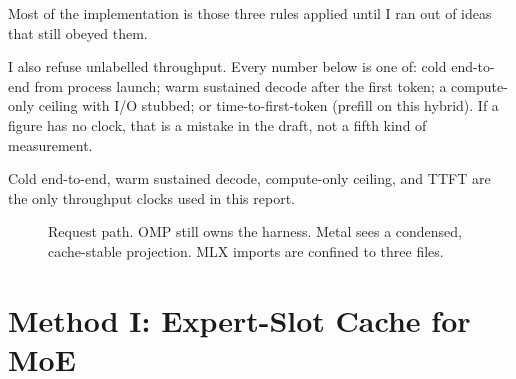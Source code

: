 Most of the implementation is those three rules applied until I ran out of ideas that still obeyed them.

I also refuse unlabelled throughput. Every number below is one of: cold end-to-end from process launch; warm sustained decode after the first token; a compute-only ceiling with I/O stubbed; or time-to-first-token (prefill on this hybrid). If a figure has no clock, that is a mistake in the draft, not a fifth kind of measurement.

\begin{proposition}
Cold end-to-end, warm sustained decode, compute-only ceiling, and TTFT are the only throughput clocks used in this report.
\end{proposition}

\begin{figure}[t]
\centering
{}
\caption{Request path. OMP still owns the harness. Metal sees a condensed, cache-stable projection. MLX imports are confined to three files.}
\label{fig:arch}
\end{figure}

\section{Method I: Expert-Slot Cache for MoE}
\label{sec:moe}

